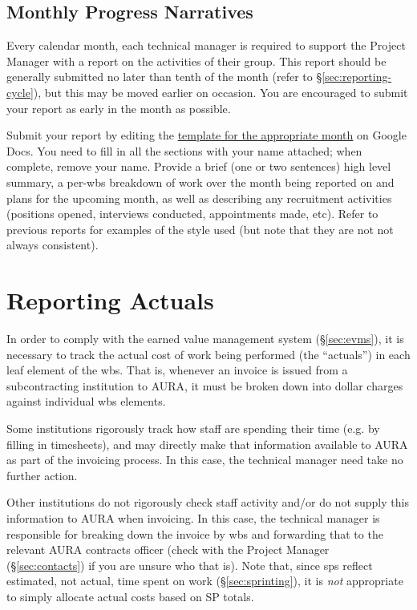 \subsection{Monthly Progress Narratives}
\label{sec:monthly-narrative}

Every calendar month, each technical manager is required to support the
Project Manager with a report on the activities of their group. This
report should be generally submitted no later than tenth of the month
(refer to \S\ref{sec:reporting-cycle}), but this may be moved earlier on
occasion. You are encouraged to submit your report as early in the month
as possible.

Submit your report by editing the
\href{https://drive.google.com/drive/u/0/folders/0BxgFbTQURmr6TUJleXZaY2ZNcEE}{template
for the appropriate month} on Google Docs. You need to fill in all the
sections with your name attached; when complete, remove your name.
Provide a brief (one or two sentences) high level summary, a per-\gls{wbs}
breakdown of work over the month being reported on and plans for the
upcoming month, as well as describing any recruitment activities
(positions opened, interviews conducted, appointments made, etc). Refer
to previous reports for examples of the style used (but note that they
are not not always consistent).

\section{Reporting Actuals}
\label{sec:actuals}

In order to comply with the earned value management system (\S\ref{sec:evms}), it is necessary to track the actual cost of work being performed (the ``actuals'') in each leaf \gls{element} of the \gls{wbs}.
That is, whenever an invoice is issued from a subcontracting institution to AURA, it must be broken down into dollar charges against individual \gls{wbs} elements.

Some institutions rigorously track how staff are spending their time
(e.g. by filling in timesheets), and may directly make that information
available to AURA as part of the invoicing process. In this case, the
technical manager need take no further action.

Other institutions do not rigorously check staff activity and/or do not supply this information to AURA when invoicing.
In this case, the technical manager is responsible for breaking down the invoice by \gls{wbs} and forwarding that to the relevant AURA contracts officer (check with the Project Manager (\S\ref{sec:contacts}) if you are unsure who that is).
Note that, since \glspl{sp} reflect estimated, not actual, time spent on work (\S\ref{sec:sprinting}), it is \emph{not} appropriate to simply allocate actual costs based on SP totals.

